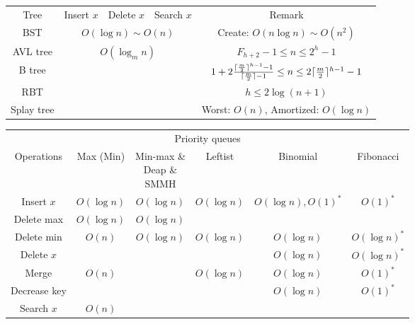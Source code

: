 \begin{enumerate}
\begin{table}[H]
\begin{tabular}{|c|c|c|c|c|}
            \Xhline{3\arrayrulewidth}
            Tree & Insert $x$ & Delete $x$ & Search $x$ & Remark \\
            \Xhline{2\arrayrulewidth}
            BST & \multicolumn{3}{c|}{$O(\log n) \sim O(n)$} & Create: $O(n\log n) \sim O(n^2)$ \\
            \hline
            AVL tree & \multicolumn{3}{c|}{\multirow{4}{*}{$O(\log_m n)$}} & $F_{h + 2} - 1 \le n \le 2^h - 1$ \\
            \cline{1-1}\cline{5-5}
            B tree & \multicolumn{3}{c|}{} & $1 + 2\frac{\lceil\frac{m}{2}\rceil^{h - 1} - 1}{\lceil\frac{m}{2}\rceil - 1} \le n \le 2\lceil\frac{m}{2}\rceil^{h - 1} - 1$ \\
            \cline{1-1}\cline{5-5}
            RBT & \multicolumn{3}{c|}{} & $h \le 2\log (n + 1)$ \\
            \cline{1-1}\cline{5-5}
            Splay tree & \multicolumn{3}{c|}{} & Worst: $O(n)$, Amortized: $O(\log n)$ \\
            \hline
        \end{tabular}
    \end{table}
    \begin{table}[H]
        \centering
        \begin{tabular}{|c|c|c|c|c|c|}
            \hline
            \multicolumn{6}{|c|}{Priority queues} \\
            \Xhline{3\arrayrulewidth}
            Operations & Max (Min) & \makecell{Min-max \&\\Deap \&\\SMMH} & Leftist & Binomial & Fibonacci \\
            \Xhline{2\arrayrulewidth}
            Insert $x$ & $O(\log n)$ & $O(\log n)$ & $O(\log n)$ & $O(\log n), O(1)^*$ & $O(1)^*$ \\
            \hline
            Delete max & $O(\log n)$ & $O(\log n)$ & & & \\
            \hline
            Delete min & $O(n)$ & $O(\log n)$ & $O(\log n)$ & $O(\log n)$ & $O(\log n)^*$ \\
            \hline
            Delete $x$ & & & & $O(\log n)$ & $O(\log n)^*$ \\
            \hline
            Merge & $O(n)$ & & $O(\log n)$ & $O(\log n)$ & $O(1)^*$ \\
            \hline
            Decrease key & & & & $O(\log n)$ & $O(1)^*$ \\
            \hline
            Search $x$ & $O(n)$ & & & & \\

\end{tabular}
\end{table}
\end{enumerate}
